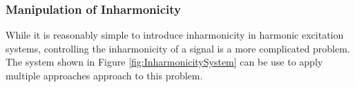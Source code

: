 %
%
%
%

		\subsubsection*{Manipulation of Inharmonicity}
			While it is reasonably simple to introduce inharmonicity in harmonic excitation systems,
			controlling the inharmonicity of a signal is a more complicated problem. The system shown in Figure
			\ref{fig:InharmonicitySystem} can be use to apply multiple approaches approach to this problem. 

			

